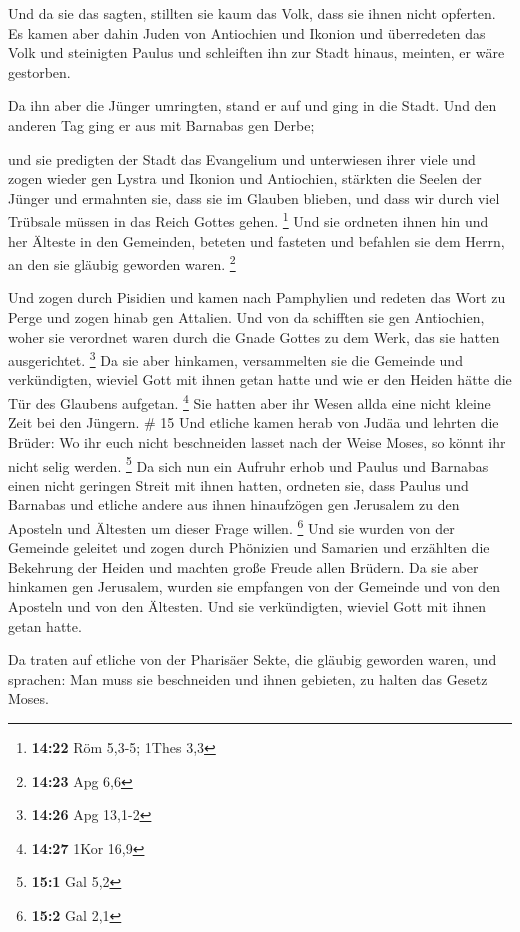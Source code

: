  Und da sie das sagten, stillten sie kaum das Volk, dass
sie ihnen nicht opferten.  Es kamen aber dahin Juden von
Antiochien und Ikonion und überredeten das Volk und steinigten Paulus
und schleiften ihn zur Stadt hinaus, meinten, er wäre gestorben.

 Da ihn aber die Jünger umringten, stand er auf und ging in
die Stadt. Und den anderen Tag ging er aus mit Barnabas gen Derbe;

 und sie predigten der Stadt das Evangelium und unterwiesen
ihrer viele und zogen wieder gen Lystra und Ikonion und Antiochien,
 stärkten die Seelen der Jünger und ermahnten sie, dass sie
im Glauben blieben, und dass wir durch viel Trübsale müssen in das Reich
Gottes gehen. \footnote{\textbf{14:22} Röm 5,3-5; 1Thes 3,3}
 Und sie ordneten ihnen hin und her Älteste in den
Gemeinden, beteten und fasteten und befahlen sie dem Herrn, an den sie
gläubig geworden waren. \footnote{\textbf{14:23} Apg 6,6}

 Und zogen durch Pisidien und kamen nach Pamphylien
 und redeten das Wort zu Perge und zogen hinab gen
Attalien.  Und von da schifften sie gen Antiochien, woher
sie verordnet waren durch die Gnade Gottes zu dem Werk, das sie hatten
ausgerichtet. \footnote{\textbf{14:26} Apg 13,1-2}  Da sie
aber hinkamen, versammelten sie die Gemeinde und verkündigten, wieviel
Gott mit ihnen getan hatte und wie er den Heiden hätte die Tür des
Glaubens aufgetan. \footnote{\textbf{14:27} 1Kor 16,9}  Sie
hatten aber ihr Wesen allda eine nicht kleine Zeit bei den Jüngern. \#
15  Und etliche kamen herab von Judäa und lehrten die
Brüder: Wo ihr euch nicht beschneiden lasset nach der Weise Moses, so
könnt ihr nicht selig werden. \footnote{\textbf{15:1} Gal 5,2}
 Da sich nun ein Aufruhr erhob und Paulus und Barnabas einen
nicht geringen Streit mit ihnen hatten, ordneten sie, dass Paulus und
Barnabas und etliche andere aus ihnen hinaufzögen gen Jerusalem zu den
Aposteln und Ältesten um dieser Frage willen. \footnote{\textbf{15:2}
  Gal 2,1}  Und sie wurden von der Gemeinde geleitet und
zogen durch Phönizien und Samarien und erzählten die Bekehrung der
Heiden und machten große Freude allen Brüdern.  Da sie aber
hinkamen gen Jerusalem, wurden sie empfangen von der Gemeinde und von
den Aposteln und von den Ältesten. Und sie verkündigten, wieviel Gott
mit ihnen getan hatte.

 Da traten auf etliche von der Pharisäer Sekte, die gläubig
geworden waren, und sprachen: Man muss sie beschneiden und ihnen
gebieten, zu halten das Gesetz Moses.

